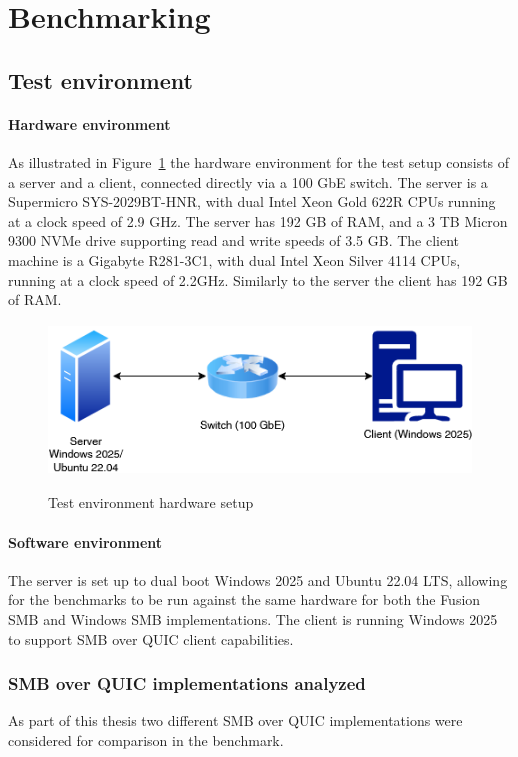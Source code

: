 \documentclass[english, 12pt, a4paper, elec, utf8, a-2b, online]{aaltothesis}
\begin{document}
\clearpage
\section{Benchmarking}
\label{sec:benchmark}
\subsection{Test environment}

\paragraph{Hardware environment}

As illustrated in Figure~\ref{fig:hardware} the hardware environment for the test setup consists
of a server and a client, connected directly via a 100 GbE switch. The server is a Supermicro
SYS-2029BT-HNR, with dual Intel Xeon Gold 622R CPUs running at a clock speed of 2.9 GHz. The server
has 192 GB of RAM, and a 3 TB Micron 9300 NVMe drive supporting read and write speeds of 3.5 GB. The client
machine is a Gigabyte R281-3C1, with dual Intel Xeon Silver 4114 CPUs, running at a clock speed of 2.2GHz.
Similarly to the server the client has 192 GB of RAM.

\begin{figure}[h]
	\centering
	\includegraphics[alt={Block diagram of hardware setup of test environment}, height=4cm]{./images/hardware.png}
	\caption{Test environment hardware setup}
	\label{fig:hardware}
\end{figure}

\paragraph{Software environment}

The server is set up to dual boot Windows 2025 and Ubuntu 22.04 LTS, allowing for the benchmarks to
be run against the same hardware for both the Fusion SMB and Windows SMB implementations. The
client is running Windows 2025 to support SMB over QUIC client capabilities.

\subsubsection{SMB over QUIC implementations analyzed}
As part of this thesis two different SMB over QUIC implementations were considered
for comparison in the benchmark.
\end{document}
